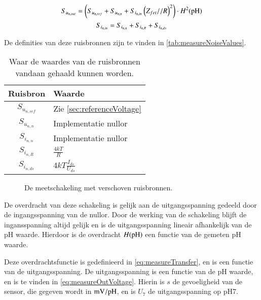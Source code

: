 \begin{equation}\label{eq:measureNoiseOut}
    S_{u_{{n,out}}} = \left(S_{u_{{n,ref}}} + S_{u_{{n,n}}} + S_{i_{{n,in}}}\left(Z_{fet} // R\right)^2\right) \cdot H^2(\ph)
    \tagaddtext{[\si{\volt\squared\per\hertz}]}
\end{equation}
\begin{equation}
    S_{i_{{n,in}}} = S_{i_{{n,n}}} + S_{i_{{n,R}}} + S_{i_{{n,ds}}}
    \tagaddtext{[\si{\ampere\squared\per\hertz}]}
    \label{eq:measureNoiseCurrentIn}
\end{equation}


De definities van deze ruisbronnen zijn te vinden in \autoref{tab:measureNoiseValues}.

\begin{table}[ht]
    \centering
    \begin{tabular}{c|l}
        Ruisbron & Waarde \\
        \hline 
        $S_{u_{{n,ref}}}$ & Zie \autoref{sec:referenceVoltage} \\
        $S_{u_{{n,n}}}$   & Implementatie nullor \\
        $S_{i_{{n,n}}}$   & Implementatie nullor \\
        $S_{i_{{n,R}}}$   & $\frac{4kT}{R}$ \\
        $S_{i_{{n,ds}}}$  & $4kT\frac{I_{ds}}{U_{ds}}$ \\
    \end{tabular}
    \caption{Waar de waardes van de ruisbronnen vandaan gehaald kunnen worden.}
    \label{tab:measureNoiseValues}
\end{table}

\begin{figure}[ht]
    \centering
    \def\svgwidth{0.6\textwidth}
    
    \caption{De meetschakeling met verschoven ruisbronnen.}
    \label{fig:measureNoiseMoved}
\end{figure}

De overdracht van deze schakeling is gelijk aan de uitgangsspanning gedeeld door de ingangsspanning van de nullor. Door de werking van de schakeling blijft de ingansspanning altijd gelijk en is de uitgangsspanning lineair afhankelijk van de pH waarde. Hierdoor is de overdracht $H(\ph)$ een functie van de gemeten pH waarde.

Deze overdrachtsfunctie is gedefinieerd in \autoref{eq:measureTransfer}, en is een functie van de uitgangsspanning. De uitgangsspanning is een functie van de pH waarde, en is te vinden in \autoref{eq:measureOutVoltage}. Hierin is $s$ de gevoeligheid van de sensor, die gegeven wordt in $\si{\milli\volt\per\ph}$, en is $U_7$ de uitgangsspanning op pH7.

